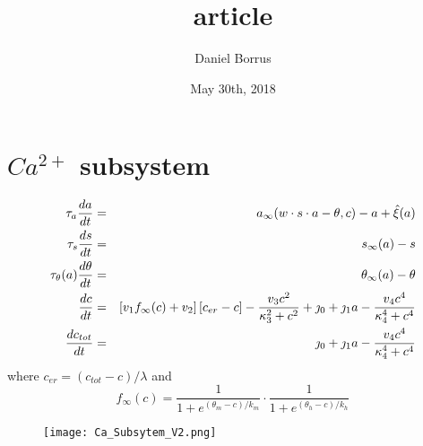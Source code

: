 \documentclass[12pt]{article}	%
\title{article}
\date{May 30th, 2018}
\author{Daniel Borrus}
\def\w{w}
\def\taus{\tau_s}
\def\ainf{a_\infty}
\def\sinf{s_\infty}
\def\thetainf{\theta_\infty}
\def\tautheta{\tau_\theta}
\def\ctot{c_{tot}}
\def\cer{c_{er}}
\def\finf{f_\infty}
\def\thetam{\theta_m}
\def\km{k_m}
\def\thetah{\theta_h}
\def\kh{k_h}
\begin{document}
\section*{$Ca^{2+}$ subsystem}

\begin{eqnarray*}
	\tau_a \ddt{a} &=& \ainf (\w \cdot s \cdot a -\theta , c) - a + \hat{\xi}(a) \\
	\taus \ddt{s} &=& \sinf (a) - s  \\
	\tautheta(a) \ddt{\theta} &=& \thetainf (a) - \theta     \\
	\ddt{c} &=&  \left[ v_1 \finf(c) + v_2 \right] [\cer - c ] - \frac{v_3 c^2 }{\kappa_3^2 + c^2} + \jmath_0 + \jmath_1 a   -  \frac{v_4 c^4}{\kappa_4^4+c^4}   \\
	\ddt{\ctot} &=& \jmath_0 + \jmath_1 a -   \frac{v_4 c^4}{\kappa_4^4+c^4}
\end{eqnarray*}
where  $\cer = (\ctot-c)/\lambda$ and 
\begin{equation}
\finf(c) =  \frac{1}{1+e^{(\thetam-c)/\km}} \cdot  \frac{1}{1+e^{(\thetah-c)/\kh}}  \nonumber 
\end{equation}

\begin{figure}[h!]
	\centering
	\texttt{[image: Ca\_Subsytem\_V2.png]}
\end{figure}
\end{document}
